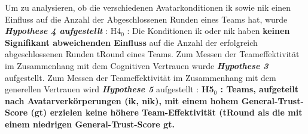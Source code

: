 \documentclass[a4paper,11pt]{article}%
\renewcommand{\\}{\vspace*{0.5\baselineskip} \newline}
\begin{document}
Um zu analysieren, ob die verschiedenen Avatarkonditionen \ac{ik} sowie \ac{nik} einen Einfluss auf die Anzahl der Abgeschlossenen Runden eines Teams hat, wurde \textbf{\textit{Hypothese 4 aufgestellt}} :\\
H4$_{0}$ : Die Konditionen \ac{ik} oder \ac{nik} haben \textbf{keinen Signifikant abweichenden Einfluss} auf die Anzahl der erfolgreich abgeschlossenen Runden \ac{tRound} eines Teams.\\
Zum Messen der Teameffektivität im Zusammenhang mit dem Cognitiven Vertrauen wurde \textbf{\textit{Hypothese 3}} aufgestellt. Zum Messen der Teameffektivität im Zusammenhang mit dem generellen Vertrauen wird \textbf{\textit{Hypothese 5}} aufgestellt :
\\
\textbf{H5$_{0}$ : Teams, aufgeteilt nach Avatarverkörperungen (\ac{ik}, \ac{nik}), mit einem hohem General-Trust-Score (\ac{gt}) erzielen \textbf{keine höhere Team-Effektivität} (\ac{tRound} als die mit einem niedrigen General-Trust-Score \ac{gt}.}	
%	
\end{document}
